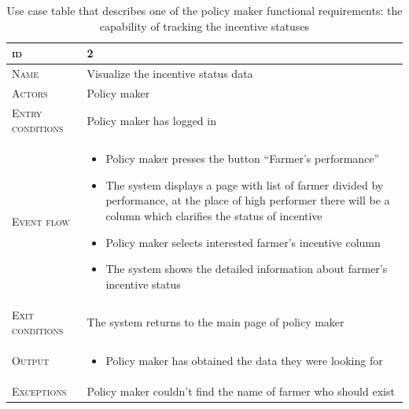 \begin{table}[H]
    \centering
    \begin{tabular}{|l|p{}|}
        \hline %
    	\textsc{id}                 &   2\\
    	\hline %
    	\textsc{Name}               &   Visualize the incentive status data\\
    	\hline %
    	\textsc{Actors}             &   Policy maker\\
    	\hline %
    	\textsc{Entry conditions}   &   Policy maker has logged in\\
    	\hline %
    	\textsc{Event flow}         &   \footnotesize
            	                        \begin{itemize}
                                    	    \item Policy maker presses the button “Farmer’s performance”
                                    		\item The system displays a page with list of farmer divided by performance, at the place of high performer there will be a column which clarifies the status of incentive 
                                       		\item Policy maker selects interested farmer’s incentive column
                                    		\item The system shows the detailed information about farmer’s incentive status
                                        \end{itemize}\\
        \hline %
        \textsc{Exit conditions}    &  The system returns to the main page of policy maker\\
    	\hline %
    	\textsc{Output}             &  \begin{itemize}
    	    \item Policy maker has obtained the data they were looking for
    	\end{itemize}\\
    	\hline %
    	\textsc{Exceptions}         &  Policy maker couldn’t find the name of farmer who should exist\\
    	\hline %
        
    \end{tabular}
    \caption{\label{tab:visualize_incentives}Use case table that describes one of the policy maker functional requirements:  the capability of tracking the incentive statuses} %
\end{table}

